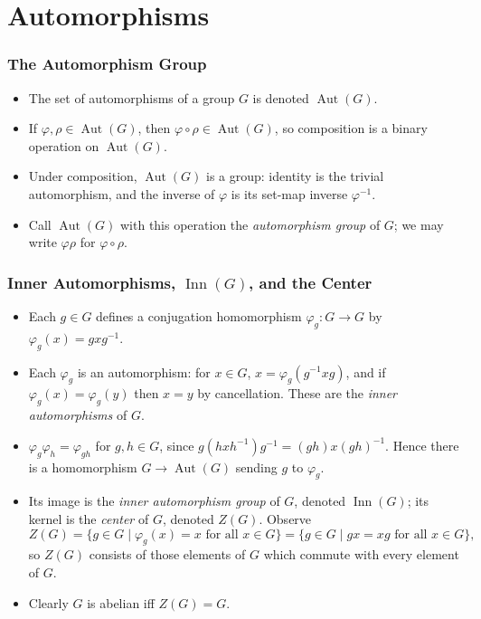 \documentclass[../Odyssey_Project.tex]{subfiles}
\begin{document}
\setcounter{section}{1}
\section{Automorphisms}

\subsubsection*{The Automorphism Group}
\begin{itemize}
    \item The set of automorphisms of a group $G$ is denoted $\operatorname{Aut}(G)$.
    \item If $\varphi, \rho \in \operatorname{Aut}(G)$, then $\varphi \circ \rho \in \operatorname{Aut}(G)$, so composition is a binary operation on $\operatorname{Aut}(G)$.
    \item Under composition, $\operatorname{Aut}(G)$ is a group: identity is the trivial automorphism, and the inverse of $\varphi$ is its set-map inverse $\varphi^{-1}$.
    \item Call $\operatorname{Aut}(G)$ with this operation the \emph{automorphism group} of $G$; we may write $\varphi\rho$ for $\varphi \circ \rho$.
\end{itemize}

\subsubsection*{Inner Automorphisms, $\operatorname{Inn}(G)$, and the Center}
\begin{itemize}
    \item Each $g \in G$ defines a conjugation homomorphism $\varphi_g : G \to G$ by $\varphi_g(x) = gxg^{-1}$.
    \item Each $\varphi_g$ is an automorphism: for $x \in G$, $x = \varphi_g(g^{-1}xg)$, and if $\varphi_g(x) = \varphi_g(y)$ then $x = y$ by cancellation. These are the \emph{inner automorphisms} of $G$.
    \item $\varphi_g \varphi_h = \varphi_{gh}$ for $g,h \in G$, since $g(hxh^{-1})g^{-1} = (gh)x(gh)^{-1}$. Hence there is a homomorphism $G \to \operatorname{Aut}(G)$ sending $g$ to $\varphi_g$.
    \item Its image is the \emph{inner automorphism group} of $G$, denoted $\operatorname{Inn}(G)$; its kernel is the \emph{center} of $G$, denoted $Z(G)$. Observe
    \[
    Z(G) = \{g \in G \mid \varphi_g(x) = x \text{ for all } x \in G\}
         = \{g \in G \mid gx = xg \text{ for all } x \in G\},
    \]
    so $Z(G)$ consists of those elements of $G$ which commute with every element of $G$.
    \item Clearly $G$ is abelian iff $Z(G) = G$.
\end{itemize}
\end{document}
